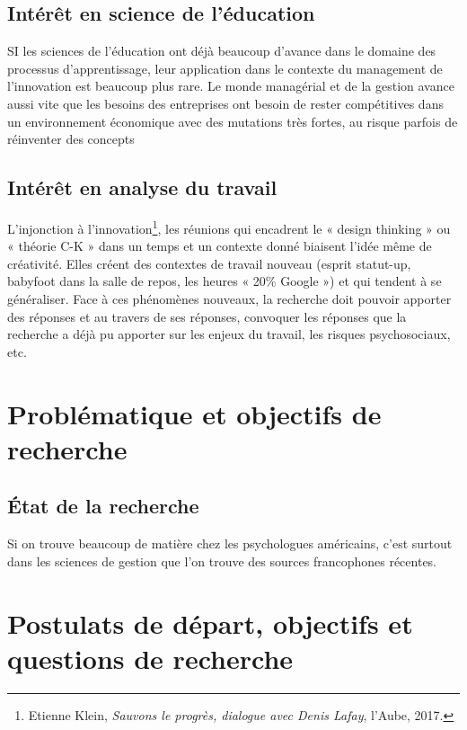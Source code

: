 \documentclass{article}
\begin{document}
\subsection{Intérêt en science de l'éducation}

SI les sciences de l'éducation ont déjà beaucoup d'avance dans le domaine des processus d'apprentissage, leur application dans le contexte du management de l'innovation est beaucoup plus rare. Le monde managérial et de la gestion avance aussi vite que les besoins des entreprises ont besoin de rester compétitives dans un environnement économique avec des mutations très fortes, au risque parfois de réinventer des concepts 

\subsection{Intérêt en analyse du travail}

L'injonction à l'innovation\footnote{Etienne Klein, \textit{Sauvons le progrès, dialogue avec Denis Lafay}, l’Aube, 2017.}, les réunions qui encadrent le « design thinking » ou « théorie C-K » dans un temps et un contexte donné biaisent l'idée même de créativité.
Elles créent des contextes de travail nouveau (esprit statut-up, babyfoot dans la salle de repos, les heures « 20\% Google ») et qui tendent à se généraliser. 
Face à ces phénomènes nouveaux, la recherche doit pouvoir apporter des réponses et au travers de ses réponses, convoquer les réponses que la recherche a déjà pu apporter sur les enjeux du travail, les risques psychosociaux, etc.

\section{Problématique et objectifs de recherche}

\subsection{État de la recherche}

Si on trouve beaucoup de matière chez les psychologues américains, c'est surtout dans les sciences de gestion que l'on trouve des sources francophones récentes. 

\section{Postulats de départ, objectifs et questions de recherche}
\end{document}
